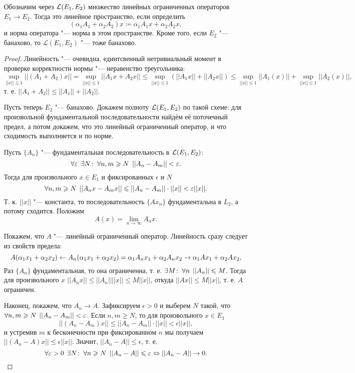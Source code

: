 \documentclass[main]{subfiles}
\begin{document}
\begin{theorem}
  Обозначим через \( \Linears{E_1}[E_2] \)
  множество линейных ограниченных операторов
  \( E_1 \to E_2 \).
  Тогда это линейное пространство, если определить
  \[
    (\alpha_1 A_1 + \alpha_2 A_2) x \coloneqq
    \alpha_1 A_1 x + \alpha_2 A_2 x,
  \]
  и норма оператора "--- норма в этом пространстве.
  Кроме того, если \( E_2 \) "--- банахово, то
  \( \mathcal{L}(E_1, E_2) \) "--- тоже банахово.
\end{theorem}
\begin{proof}
  Линейность "--- очевидна, единтсвенный нетривиальный
  момент в проверке корректности нормы "--- неравенство
  треугольника:
  \[
    \sup_{||x|| \le 1} ||(A_1 + A_2) x|| =
    \sup_{||x|| \le 1} ||A_1 x + A_2 x|| \le
    \sup_{||x|| \le 1} \left( ||A_1 x|| + ||A_2 x|| \right) \le
    \sup_{||x|| \le 1} ||A_1(x)|| + \sup_{||x|| \le 1} ||A_2(x)||,
  \]
  т. е. \( ||A_1 + A_2|| \le ||A_1|| + ||A_2|| \).

  Пусть теперь \( E_2 \) "--- банахово.
  Докажем полноту \( \Linears{E_1}[E_2] \) по такой схеме:
  для произвольной фундаментальной последовательности
  найдём её поточечный предел,
  а потом докажем, что это линейный ограниченный оператор,
  и что сходимость выполняется и по норме.
  
  Пусть \( \{ A_n \} \) "--- фундаментальная последовательность
  в \( \Linears{E_1}[E_2] \):
  \[ \forall {\varepsilon} \; \, \exists N \colon \: \forall {n, m \geqslant N} \; \, ||A_n - A_m|| < \varepsilon. \]
  Тогда для произвольного \( x \in E_1 \)
  и фиксированных \( \epsilon \) и \( N \)
  \[
    \forall {n, m \geqslant N} \; \, ||A_n x - A_m x|| \leqslant ||A_n - A_m|| \cdot ||x|| < \varepsilon ||x||.
  \]
  Т. к. \( ||x|| \) "--- константа, то
  последовательность \( \{ A x_n \} \) фундаментальна в \( L_2 \),
  а потому сходится.
  Положим
  \[ A(x) = \lim_{n \to \infty} A_n x. \]

  Покажем, что \( A \) "--- линейный ограниченный оператор.
  Линейность сразу следует из свойств предела:
  \[
    A(\alpha_1 x_1 + \alpha_2 x_2) \leftarrow
    A_n(\alpha_1 x_1 + \alpha_2 x_2) =
    \alpha_1 A_n x_1 + \alpha_2 A_n x_2 \to
    \alpha_1 A x_1 + \alpha_2 A x_2,
  \]
  Раз \( \{ A_n \} \) фундаментальная, то она ограниченна,
  т. е. \( \exists M \colon \: \forall {n} \; \, ||A_n|| \leqslant M \).
  Тогда для произвольного \( x \)
  \( ||A_n x|| \le ||A_n||||x|| \le M ||x|| \),
  откуда \( ||A x|| \le M ||x|| \),
  т. е. \( A \) ограничен.

  Наконец, покажем, что \( A_n \to A \).
  Зафиксируем \( \epsilon > 0 \) и выберем
  \( N \) такой, что
  \(  \forall {n, m \geqslant N} \; \, ||A_n - A_m|| < \varepsilon \).
  Если \( n, m \ge N \), то для произвольного
  \( x \in E_1 \)
  \[ ||(A_n - A_m) x|| \le ||A_n - A_m|| \cdot ||x|| < \epsilon ||x||, \]
  и устремив \( m \) к бесконечности при
  фиксированном \( n \) мы получаем
  \( ||(A_n - A) x|| \le \epsilon ||x|| \).
  Значит, \( ||A_n - A|| \le \epsilon \),
  т. е.
  \[
    \forall {\varepsilon> 0} \; \,
    \exists N \colon \:
    \forall {n \geqslant N} \; \, ||A_n - A||
    \leqslant \varepsilon
    \Leftrightarrow
    ||A_n - A|| \to 0.
  \]
\end{proof}
\end{document}
